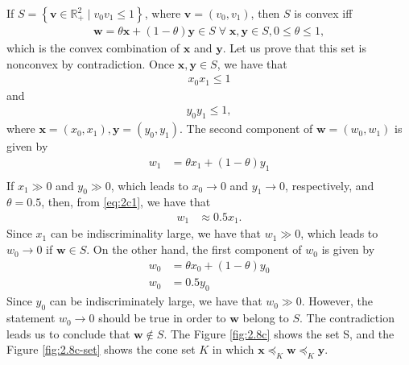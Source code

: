 \documentclass[12pt,a4paper]{article}
\begin{document}
If \(S = \left\{ \mathbf{v} \in \mathbb{R}_{+}^{2} \mid v_0v_1 \leq 1 \right\}\), where \(\mathbf{v} = (v_0, v_1)\), then \(S\) is convex iff
\begin{align}
    \mathbf{w} = \theta \mathbf{x} + (1-\theta)\mathbf{y} \in S \;\forall\; \mathbf{x}, \mathbf{y} \in S, 0\leq\theta\leq 1,
    \label{eq:convex-rule}
\end{align}
which is the convex combination of \(\mathbf{x}\) and \(\mathbf{y}\). Let us prove that this set is nonconvex by contradiction. Once \(\mathbf{x}, \mathbf{y} \in S\), we have that
\begin{align}
    x_0x_1 \leq 1
\end{align}
and
\begin{align}
    y_0y_1 \leq 1,
\end{align}
where \(\mathbf{x} = (x_0, x_1), \mathbf{y} = (y_0, y_1)\). The second component of \(\mathbf{w} = (w_0, w_1)\) is given by
\begin{align}
    \label{eq:2c1}
    w_1 & = \theta x_1 + (1-\theta)y_1 \\
\end{align}
If \(x_1 \gg 0\) and \(y_0 \gg 0\), which leads to \(x_0 \rightarrow 0\) and \(y_1 \rightarrow 0\), respectively, and \(\theta = 0.5\), then, from \eqref{eq:2c1}, we have that
\begin{align}
    w_1 & \approx 0.5 x_1.
\end{align}
Since \(x_1\) can be indiscriminality large, we have that \(w_1 \gg 0\), which leads to \(w_0 \rightarrow 0\) if \(\mathbf{w} \in S\). On the other hand, the first component of \(w_0\) is given by
\begin{align}
    \label{eq:2c2}
    w_0 & = \theta x_0 + (1-\theta)y_0 \\
    w_0 & = 0.5y_0
\end{align}
Since \(y_0\) can be indiscriminately large, we have that \(w_0 \gg 0\). However, the statement \(w_0 \rightarrow 0\) should be true in order to \(\mathbf{w}\) belong to \(S\). The contradiction leads us to conclude that \(\mathbf{w} \not\in S\). The Figure \ref{fig:2.8c} shows the set S, and the Figure \ref{fig:2.8c-set} shows the cone set \(K\) in which \(\mathbf{x} \preceq_K \mathbf{w} \preceq_K \mathbf{y}\).
\end{document}
